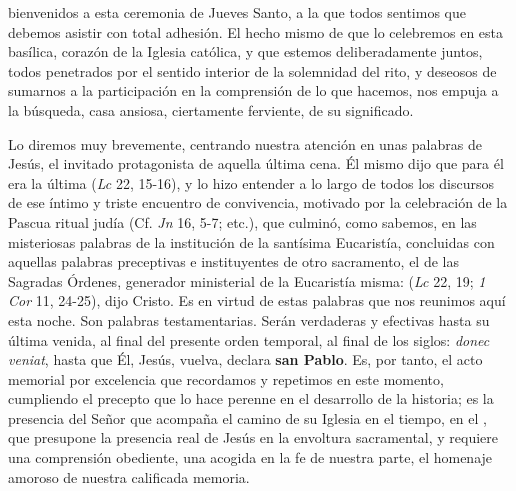 \begin{body}
 bienvenidos a esta ceremonia de Jueves Santo, a la que todos sentimos que debemos asistir con total adhesión. El hecho mismo de que lo celebremos en esta basílica, corazón de la Iglesia católica, y que estemos deliberadamente juntos, todos penetrados por el sentido interior de la solemnidad del rito, y deseosos de sumarnos a la participación en la comprensión de lo que hacemos, nos empuja a la búsqueda, casa ansiosa, ciertamente ferviente, de su significado. 

Lo diremos muy brevemente, centrando nuestra atención en unas palabras de Jesús, el invitado protagonista de aquella última cena. Él mismo dijo que para él era la última (\textit{Lc} 22, 15-16), y lo hizo entender a lo largo de todos los discursos de ese íntimo y triste encuentro de convivencia, motivado por la celebración de la Pascua ritual judía (Cf. \textit{Jn} 16, 5-7; etc.), que culminó, como sabemos, en las misteriosas palabras de la institución de la santísima Eucaristía, concluidas con aquellas palabras preceptivas e instituyentes de otro sacramento, el de las Sagradas Órdenes, generador ministerial de la Eucaristía misma:  (\textit{Lc} 22, 19; \textit{1 Cor} 11, 24-25), dijo Cristo. Es en virtud de estas palabras que nos reunimos aquí esta noche. Son palabras testamentarias. Serán verdaderas y efectivas hasta su última venida, al final del presente orden temporal, al final de los siglos: \textit{donec veniat}, hasta que Él, Jesús, vuelva, declara \textbf{san Pablo}. Es, por tanto, el acto memorial por excelencia que recordamos y repetimos en este momento, cumpliendo el precepto que lo hace perenne en el desarrollo de la historia; es la presencia del Señor que acompaña el camino de su Iglesia en el tiempo, en el , que presupone la presencia real de Jesús en la envoltura sacramental, y requiere una comprensión obediente, una acogida en la fe de nuestra parte, el homenaje amoroso de nuestra calificada memoria. 


\end{body}
